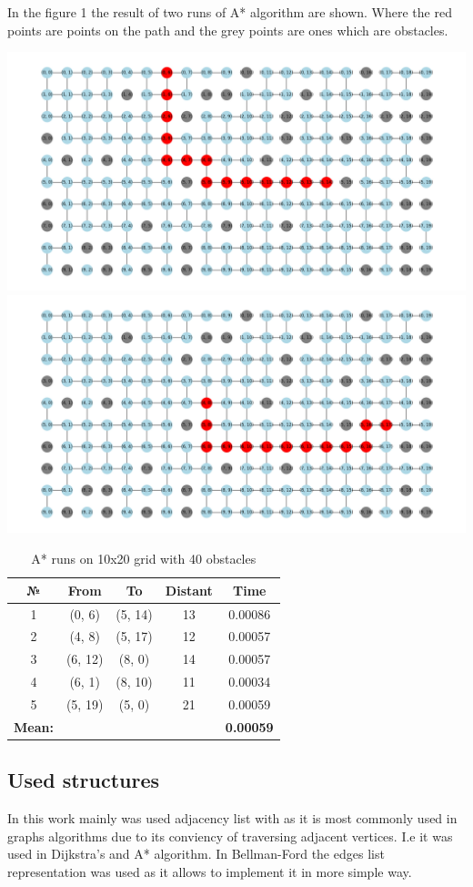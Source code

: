 In the figure 1 the result of two runs of A* algorithm are shown. Where the red points are points on the path and the grey points are ones which are obstacles.

\begin{center}
    \label{fig:1}
    \includegraphics[width=0.75\linewidth]{../results/a_star_1.png}
    \includegraphics[width=0.75\linewidth]{../results/a_star_2.png}
\end{center}


\begin{table}[h!]
    \begin{center}
        \begin{tabular}[center]{|c|c|c|c|c|}
            \hline
            № & From & To & Distant &Time\\
            \hline
            1 & (0, 6) & (5, 14) & 13 & 0.00086 \\ \hline
            2 & (4, 8) & (5, 17) & 12 & 0.00057 \\ \hline
            3 & (6, 12)& (8, 0)  & 14 & 0.00057 \\ \hline
            4 & (6, 1) & (8, 10) & 11 & 0.00034 \\ \hline
            5 & (5, 19)& (5, 0)  & 21 & 0.00059 \\ \hline
            \textbf{Mean: } & & & & \textbf{0.00059} \\  \hline       
        \end{tabular}
        \caption{A* runs on 10x20 grid with 40 obstacles}    
    \end{center}
\end{table}

\subsection*{Used structures}

In this work mainly was used adjacency list with as it is most commonly used in graphs algorithms due to its conviency of traversing adjacent vertices.
I.e it was used in Dijkstra's and A* algorithm. In Bellman-Ford the edges list representation was used as it allows to implement it in more simple way.